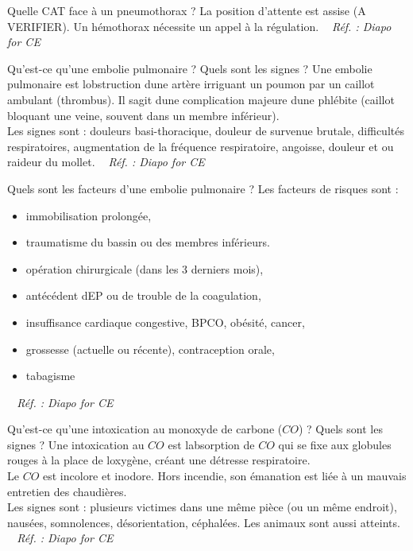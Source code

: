 \documentclass[grid,avery5371,landscape]{flashcards}
\makeatletter
\newcounter{nocarte}
\newcommand{\categ}[1]{%
  \def\@categ{#1}%
  \setcounter{nocarte}{0}%
}
\newcommand{\source}[1]{%
  \medskip
  \itshape%
   ~ \hfill Réf. : #1}
\makeatother
\begin{document}
\color[HTML]{01DF01}
\categ{CE-CP-REG}
\begin{flashcard}[CAT]{
 Quelle CAT face à un pneumothorax ?   }
  La position d'attente est assise (A VERIFIER).
    Un hémothorax nécessite un appel à la régulation.
  \source{Diapo for CE }
\end{flashcard}


\color[HTML]{01DF01}
\categ{CE-CP-REG}
\begin{flashcard}[bilan]{
 Qu'est-ce qu'une embolie pulmonaire ? Quels sont les signes ?   }
  Une embolie pulmonaire est lobstruction dune artère irriguant un poumon par un caillot ambulant (thrombus). Il sagit dune complication majeure dune phlébite (caillot bloquant une veine, souvent dans un membre inférieur). \\ Les signes sont : douleurs basi-thoracique, douleur de survenue brutale, difficultés respiratoires, augmentation de la fréquence respiratoire, angoisse, douleur et ou raideur du mollet.
  \source{Diapo for CE }
\end{flashcard}


\color[HTML]{01DF01}
\categ{CE-CP-REG}
\begin{flashcard}[bilan]{
 Quels sont les facteurs d'une embolie pulmonaire ?   }
  Les facteurs de risques sont :
   \begin{itemize}
       \item immobilisation prolongée, 
       \item traumatisme du bassin ou des membres inférieurs.     
       \item opération chirurgicale (dans les 3 derniers mois), 
       \item antécédent dEP ou de trouble de la coagulation, 
       \item insuffisance cardiaque congestive, BPCO, obésité, cancer, 
       \item grossesse (actuelle ou récente), contraception orale, 
       \item tabagisme
   \end{itemize}
  \source{Diapo for CE }
\end{flashcard}


\color[HTML]{01DF01}
\categ{CE-CP-REG}
\begin{flashcard}[bilan]{
 Qu'est-ce qu'une intoxication au monoxyde de carbone ($CO$) ? Quels sont les signes ?   }
  Une intoxication au $CO$ est labsorption de $CO$ qui se fixe aux globules rouges à la place de loxygène, créant une détresse respiratoire. \\
    Le $CO$ est incolore et inodore. Hors incendie, son émanation est liée à un mauvais entretien des chaudières. \\
    Les signes sont : plusieurs victimes dans une même pièce (ou un même endroit), nausées, somnolences, désorientation, céphalées. Les animaux sont aussi atteints.
  \source{Diapo for CE }
\end{flashcard}
\end{document}
